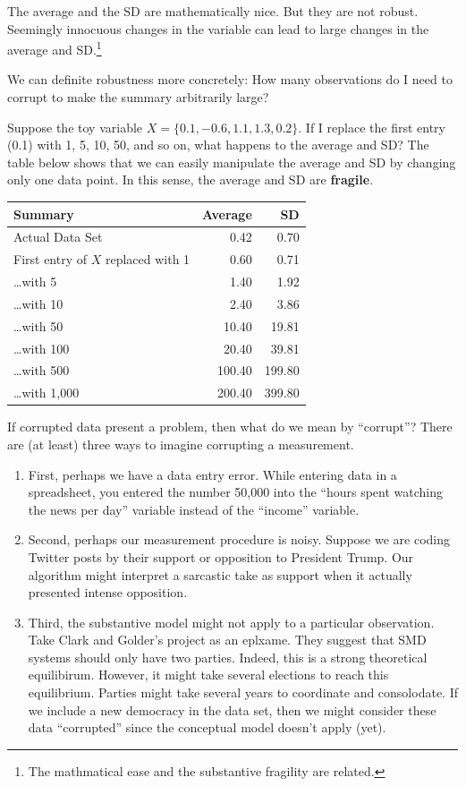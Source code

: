 \documentclass[]{book}
\providecommand{\tightlist}{%
  \setlength{\itemsep}{0pt}\setlength{\parskip}{0pt}}
\let\rmarkdownfootnote\footnote%
\def\footnote{\protect\rmarkdownfootnote}
\begin{document}
The average and the SD are mathematically nice. But they are not robust. Seemingly innocuous changes in the variable can lead to large changes in the average and SD.\footnote{The mathmatical ease and the substantive fragility are related.}

We can definite robustness more concretely: How many observations do I need to corrupt to make the summary arbitrarily large?

Suppose the toy variable \(X = \{0.1, -0.6, 1.1, 1.3, 0.2\}\). If I replace the first entry (0.1) with 1, 5, 10, 50, and so on, what happens to the average and SD? The table below shows that we can easily manipulate the average and SD by changing only one data point. In this sense, the average and SD are \textbf{fragile}.

\begin{longtable}[]{@{}lrr@{}}
\toprule
Summary & Average & SD\tabularnewline
\midrule
\endhead
Actual Data Set & 0.42 & 0.70\tabularnewline
First entry of \(X\) replaced with 1 & 0.60 & 0.71\tabularnewline
\ldots{}with 5 & 1.40 & 1.92\tabularnewline
\ldots{}with 10 & 2.40 & 3.86\tabularnewline
\ldots{}with 50 & 10.40 & 19.81\tabularnewline
\ldots{}with 100 & 20.40 & 39.81\tabularnewline
\ldots{}with 500 & 100.40 & 199.80\tabularnewline
\ldots{}with 1,000 & 200.40 & 399.80\tabularnewline
\bottomrule
\end{longtable}

If corrupted data present a problem, then what do we mean by ``corrupt''? There are (at least) three ways to imagine corrupting a measurement.

\begin{enumerate}
\def\labelenumi{\arabic{enumi}.}
\tightlist
\item
  First, perhaps we have a data entry error. While entering data in a spreadsheet, you entered the number 50,000 into the ``hours spent watching the news per day'' variable instead of the ``income'' variable.
\item
  Second, perhaps our measurement procedure is noisy. Suppose we are coding Twitter posts by their support or opposition to President Trump. Our algorithm might interpret a sarcastic take as support when it actually presented intense opposition.
\item
  Third, the substantive model might not apply to a particular observation. Take Clark and Golder's project as an eplxame. They suggest that SMD systems should only have two parties. Indeed, this is a strong theoretical equilibirum. However, it might take several elections to reach this equilibrium. Parties might take several years to coordinate and consolodate. If we include a new democracy in the data set, then we might consider these data ``corrupted'' since the conceptual model doesn't apply (yet).
\end{enumerate}
\end{document}
